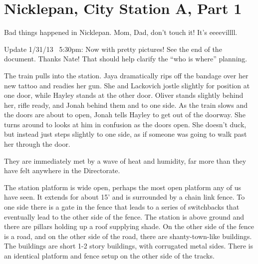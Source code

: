 \setcounter{chapter}{ 14 }
\chapter{\textbf{Nicklepan, City Station A, Part 1} }








Bad things happened in Nicklepan.  Mom, Dad, don't touch it!  It's eeeevillll.



Update 1/31/13 ~5:30pm:  Now with pretty pictures!  See the end of the document.  Thanks Nate!  That should help clarify the ``who is where'' planning.





The train pulls into the station.  Jaya dramatically rips off the bandage over her new tattoo and readies her gun.  She and Lackovich jostle slightly for position at one door, while Hayley stands at the other door.  Oliver stands slightly behind her, rifle ready, and Jonah behind them and to one side.  As the train slows and the doors are about to open, Jonah tells Hayley to get out of the doorway.  She turns around to looks at him in confusion as the doors open.  She doesn't duck, but instead just steps slightly to one side, as if someone was going to walk past her through the door.



They are immediately met by a wave of heat and humidity, far more than they have felt anywhere in the Directorate.



The station platform is wide open, perhaps the most open platform any of us have seen.  It extends for about 15' and is surrounded by a chain link fence.   To one side there is a gate in the fence that leads to a series of switchbacks that eventually lead to the other side of the fence.  The station is above ground and there are pillars holding up a roof supplying shade.  On the other side of the fence is a road, and on the other side of the road, there are shanty-town-like buildings. The buildings are short 1-2 story buildings, with corrugated metal sides.  There is an identical platform and fence setup on the other side of the tracks.



